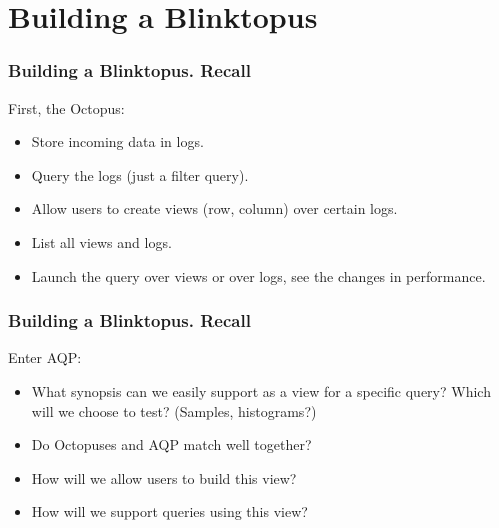 \documentclass{beamer}
\begin{document}

\section{Building a Blinktopus}
\begin{frame}
\frametitle{Building a Blinktopus. Recall}
First, the Octopus:
\begin{itemize}
\item{Store incoming data in logs.}
\item{Query the logs (just a filter query).}
\item{Allow users to create views (row, column) over certain logs.}
\item{List all views and logs.}
\item{Launch the query over views or over logs, see the changes in performance.}
\end{itemize}
\end{frame}
\begin{frame}
\frametitle{Building a Blinktopus. Recall}
Enter AQP:
\begin{itemize}
\item{What synopsis can we easily support as a view for a specific query? Which will we choose to test? (Samples, histograms?)}
\item{Do Octopuses and AQP match well together?}
\item{How will we allow users to build this view?}
\item{How will we support queries using this view?}\\
\end{itemize}
\end{frame}
\end{document}
